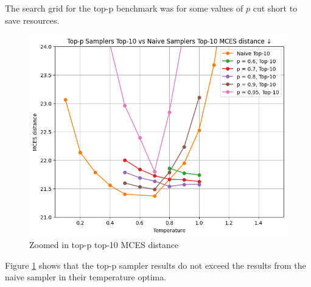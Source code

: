 The search grid for the top-p benchmark was for some values of $p$ cut short to save resources.

\begin{figure}[h]
    \centering
    \includegraphics[width=0.6\linewidth]{figures/appendix/samplers/top-p_vs_naive_top-10.png}
    \caption{Zoomed in top-p top-10 MCES distance}
    \label{fig:top-p_zoomed_appendix}
\end{figure}

Figure \ref{fig:top-p_zoomed_appendix} shows that the top-p sampler results do not exceed the results from the naive sampler in their temperature optima.